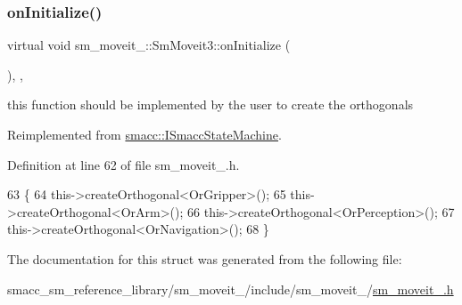 \subsubsection{\texorpdfstring{on\+Initialize()}{onInitialize()}}
{\footnotesize\ttfamily virtual void sm\+\_\+moveit\+\_\+::\+Sm\+Moveit3\+::on\+Initialize (\begin{DoxyParamCaption}{ }\end{DoxyParamCaption})\hspace{0.3cm}{\ttfamily [inline]}, {\ttfamily [override]}, {\ttfamily [virtual]}}



this function should be implemented by the user to create the orthogonals 



Reimplemented from \hyperlink{classsmacc_1_1ISmaccStateMachine_ac2982c6c8283663e5e1e8a7c82f511ec}{smacc\+::\+I\+Smacc\+State\+Machine}.



Definition at line 62 of file sm\+\_\+moveit\+\_.\+h.


\begin{DoxyCode}
63     \{
64         this->createOrthogonal<OrGripper>();
65         this->createOrthogonal<OrArm>();
66         this->createOrthogonal<OrPerception>();
67         this->createOrthogonal<OrNavigation>();
68     \}
\end{DoxyCode}


The documentation for this struct was generated from the following file\+:\begin{DoxyCompactItemize}
\item 
smacc\+\_\+sm\+\_\+reference\+\_\+library/sm\+\_\+moveit\+\_/include/sm\+\_\+moveit\+\_/\hyperlink{sm__moveit__3_8h}{sm\+\_\+moveit\+\_.\+h}\end{DoxyCompactItemize}

